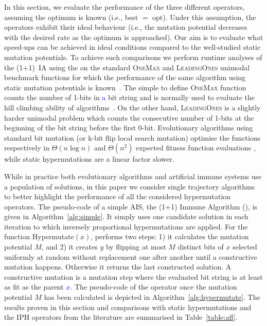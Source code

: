 \documentclass[lettersize,journal]{IEEEtran}
\newcommand{\new}[1]{\textcolor{blue}{#1}}
\begin{document}
In this section, we evaluate the performance of the three different \IPHfcm{} operators, %
assuming the optimum is known (i.e., best $=$ opt). Under this assumption, the operators exhibit their ideal behaviour (i.e., the mutation potential decreases with the desired rate as the optimum is approached).
Our aim is to evaluate what speed-ups can be achieved in ideal conditions compared to the well-studied static mutation potentials. To achieve such comparisons we perform runtime analyses of the (1+1)~IA  using the \IPHfcm{} on the standard \textsc{OneMax} and \textsc{LeadingOnes} unimodal benchmark functions for which the performance of the same algorithm using static mutation potentials is known~\cite{CorusOlivetoYazdani2019TCS}. The simple to define \textsc{OneMax} function counts the number of 1-bits in \new{a} bit string and is normally used to evaluate the hill climbing ability of algorithms~\cite{LehrTEVC2018,CorusOlivetoTEVCsteadyGA2017,CorusOlivetoAlgo2020,DoerrDoerrEbel2015}. On the other hand, \textsc{LeadingOnes} is a slightly harder unimodal problem which counts the consecutive number of 1-bits at the beginning of the bit string before the first 0-bit. 
Evolutionary algorithms using standard bit mutation (or k-bit flip local search mutation) optimise the functions respectively in $\Theta(n \log n)$ and $\Theta(n^2)$ expected fitness function evaluations \cite{DrosteJansenWegener2002,BoettcherEtAl2010,DoerrEtAl2016B,LissovoiOlivetoWarwicker2020,DLOW2018}, while static hypermutations are a linear factor slower\cite{CorusOlivetoYazdani2019TCS}.

While in practice both evolutionary algorithms and artificial immune systems use a population of solutions, in this paper we consider single trajectory algorithms to better highlight the performance of all the considered hypermutation operators.
The pseudo-code of a simple AIS,  the (1+1) Immune Algorithm (\oneoneIA{}), is given in Algorithm~\ref{alg:simple}. It simply uses one candidate solution in each iteration to which inversely proportional hypermutations are applied. For the function Hypermutate$(x)$, \IPHfcm{} performs two steps: 
1) it calculates the mutation potential $M$, and 2) it creates $y$ by flipping at most $M$ distinct bits of $x$ selected uniformly at random without replacement one after another until a constructive mutation happens. Otherwise it returns the last constructed solution. A  constructive mutation is a mutation step where the evaluated bit string is at least as fit as the parent \new{$x$}. The pseudo-code of the operator once the mutation potential $M$ has been calculated is depicted in Algorithm~\ref{alg:hypermutate}.
%
The results proven in this section and comparisons with static hypermutations and the IPH operators from the literature are summarised in Table~\ref{table:afl}.
\end{document}
